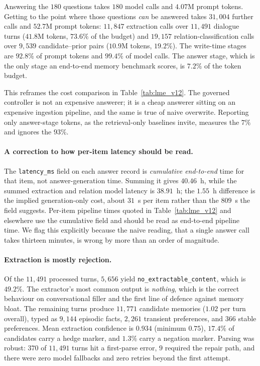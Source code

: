 Answering the $180$ questions takes $180$ model calls and $4.07$M prompt
tokens. Getting to the point where those questions \emph{can} be answered takes
$31{,}004$ further calls and $52.7$M prompt tokens: $11{,}847$ extraction calls
over $11{,}491$ dialogue turns ($41.8$M tokens, $73.6\%$ of the budget) and
$19{,}157$ relation-classification calls over $9{,}539$ candidate--prior pairs
($10.9$M tokens, $19.2\%$). The write-time stages are $92.8\%$ of prompt tokens
and $99.4\%$ of model calls. The answer stage, which is the only stage an
end-to-end memory benchmark scores, is $7.2\%$ of the token budget.

This reframes the cost comparison in Table~\ref{tab:lme_v12}. The governed
controller is not an expensive answerer; it is a cheap answerer sitting on an
expensive ingestion pipeline, and the same is true of naive overwrite. Reporting
only answer-stage tokens, as the retrieval-only baselines invite, measures the
$7\%$ and ignores the $93\%$.

\paragraph{A correction to how per-item latency should be read.}
The \texttt{latency\_ms} field on each answer record is \emph{cumulative
end-to-end} time for that item, not answer-generation time. Summing it gives
$40.46$~h, while the summed extraction and relation model latency is $38.91$~h;
the $1.55$~h difference is the implied generation-only cost, about $31$~s per
item rather than the $809$~s the field suggests. Per-item pipeline times quoted
in Table~\ref{tab:lme_v12} and elsewhere use the cumulative field and should be
read as end-to-end pipeline time. We flag this explicitly because the naive
reading, that a single answer call takes thirteen minutes, is wrong by more
than an order of magnitude.

\paragraph{Extraction is mostly rejection.}
Of the $11{,}491$ processed turns, $5{,}656$ yield
\texttt{no\_extractable\_content}, which is $49.2\%$. The extractor's most
common output is
\emph{nothing}, which is the correct behaviour on conversational filler and the
first line of defence against memory bloat. The remaining turns produce
$11{,}771$ candidate memories ($1.02$ per turn overall), typed as $9{,}144$
episodic facts, $2{,}261$ transient preferences, and $366$ stable preferences.
Mean extraction confidence is $0.934$ (minimum $0.75$), $17.4\%$ of candidates
carry a hedge marker, and $1.3\%$ carry a negation marker. Parsing was robust:
$370$ of $11{,}491$ turns hit a first-parse error, $9$ required the repair path,
and there were zero model fallbacks and zero retries beyond the first attempt.

